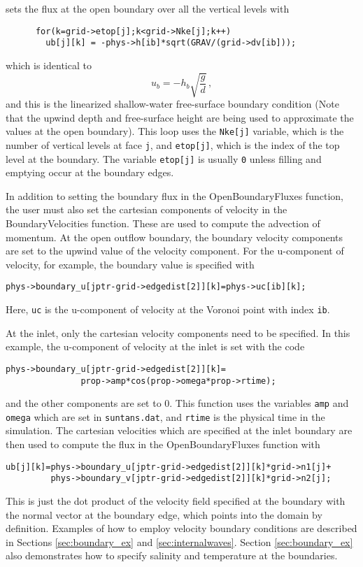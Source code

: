 sets the flux at the open boundary over all the vertical levels with
\begin{verbatim}
      for(k=grid->etop[j];k<grid->Nke[j];k++) 
        ub[j][k] = -phys->h[ib]*sqrt(GRAV/(grid->dv[ib]));
\end{verbatim}
which is identical to 
\[ u_b = -h_b\sqrt{\frac{g}{d}} \,,\]
and this is the linearized shallow-water free-surface boundary condition (Note that the upwind depth
and free-surface height are being used to approximate the values at the open boundary).  This loop uses
the \verb+Nke[j]+ variable, which is the number of vertical levels at face \verb+j+,
and \verb+etop[j]+, which is the index of the top level at the boundary.  The variable
\verb+etop[j]+ is usually \verb+0+ unless filling and emptying occur at the boundary
edges.  

In addition to setting
the boundary flux in the OpenBoundaryFluxes function, the user must also set the cartesian components
of velocity in the BoundaryVelocities function.  These are used to compute the advection of momentum.
At the open outflow boundary, the boundary velocity components are set to the upwind value of the velocity
component.  For the u-component of velocity, for example, the boundary value is specified
with
\begin{verbatim}
phys->boundary_u[jptr-grid->edgedist[2]][k]=phys->uc[ib][k];
\end{verbatim}
Here, \verb+uc+ is the u-component of velocity at the Voronoi point with index \verb+ib+.

At the inlet, only the cartesian velocity components need to be specified.  In this example,
the u-component of velocity at the inlet is set with the code
\begin{verbatim}
phys->boundary_u[jptr-grid->edgedist[2]][k]=
               prop->amp*cos(prop->omega*prop->rtime);
\end{verbatim}
and the other components are set to 0.  This function uses the variables \verb+amp+ and \verb+omega+
which are set in \verb+suntans.dat+, and \verb+rtime+ is the physical time in the simulation.
The cartesian velocities which are specified at the inlet boundary are then used to compute
the flux in the OpenBoundaryFluxes function with
\begin{verbatim}
ub[j][k]=phys->boundary_u[jptr-grid->edgedist[2]][k]*grid->n1[j]+
         phys->boundary_v[jptr-grid->edgedist[2]][k]*grid->n2[j];
\end{verbatim}
This is just the dot product of the velocity field specified at the boundary with the
normal vector at the boundary edge, which points into the domain by definition.
Examples of how to employ velocity boundary conditions are described in Sections \ref{sec:boundary_ex}
and \ref{sec:internalwaves}.  Section \ref{sec:boundary_ex} also demonstrates 
how to specify salinity and temperature at the boundaries.


